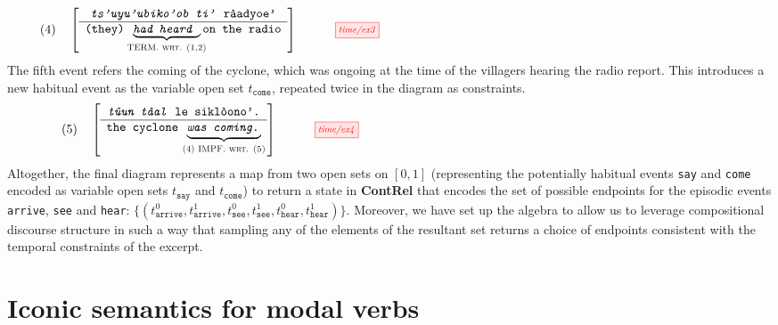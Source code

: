 \begin{example}
\[(4) \quad \left[ \begin{array}{c} \texttt{\emph{ts'uyu'ubiko'ob ti'} r\`{a}adyoe'} \\ \hline \texttt{(they) }\underbrace{\texttt{\emph{had heard }}}_{\textsc{\makebox[0pt]{TERM. wrt. (1,2)}}}\texttt{on the radio} \end{array} \right] \quad \vcenter{\scalebox{0.75}{\tikzfig{time/ex3}}}\]
The fifth event refers the coming of the cyclone, which was ongoing at the time of the villagers hearing the radio report. This introduces a new habitual event as the variable open set $t_\texttt{come}$, repeated twice in the diagram as constraints.
\[(5) \quad \left[ \begin{array}{c} \texttt{\emph{t\'{u}un t\`{a}al} le sikl\`{o}ono'.} \\ \hline \texttt{the cyclone }\underbrace{\texttt{\emph{was coming.}}}_{\textsc{\makebox[0pt]{(4) IMPF. wrt. (5)}}} \end{array} \right] \quad \vcenter{\scalebox{0.75}{\tikzfig{time/ex4}}}\]
Altogether, the final diagram represents a map from two open sets on $[0,1]$ (representing the potentially habitual events \texttt{say} and \texttt{come} encoded as variable open sets $t_\texttt{say}$ and $t_\texttt{come}$) to return a state in \textbf{ContRel} that encodes the set of possible endpoints for the episodic events \texttt{arrive}, \texttt{see} and \texttt{hear}: $\{(t_\texttt{arrive}^0,t_\texttt{arrive}^1,t_\texttt{see}^0,t_\texttt{see}^1,t_\texttt{hear}^0,t_\texttt{hear}^1)\}$. Moreover, we have set up the algebra to allow us to leverage compositional discourse structure in such a way that sampling any of the elements of the resultant set returns a choice of endpoints consistent with the temporal constraints of the excerpt.
\end{example}

\newpage
\section{Iconic semantics for modal verbs}

